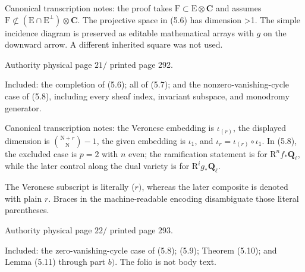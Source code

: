 \documentclass[10pt,leqno]{article}
\begin{document}
\noindent Canonical transcription notes: the proof takes \(\mathrm{F}\subset \mathrm{E}\otimes \mathbf{C}\) and assumes \(\mathrm{F}\not\subset (\mathrm{E}\cap \mathrm{E}^{\perp })\otimes \mathbf{C}\). The projective space in (5.6) has dimension >1. The simple incidence diagram is preserved as editable mathematical arrays with \(g\) on the downward arrow. \(\mathrm{A}\) different inherited square was not used.\par

\clearpage

\label{physical-21}\par\smallskip

\noindent Authority physical page \(21 /\) printed page 292.\par

\noindent Included: the completion of (5.6); all of (5.7); and the nonzero-vanishing-cycle case of (5.8), including every sheaf index, invariant subspace, and monodromy generator.\par

\noindent Canonical transcription notes: the Veronese embedding is \(\iota_{(r)}\), the displayed dimension is \(\binom{\mathrm{N}+r}{\mathrm{N}}- 1\), the given embedding is \(\iota _{1}\), and \(\iota _{r}=\iota_{(r)}\circ \iota _{1}\). In (5.8), the excluded case is \(p=2\) with \(n\) even; the ramification statement is for \(\mathrm{R}^{n} f_{*}\mathbf{Q}_{\ell }\), while the later control along the dual variety is for \(\mathrm{R}^{i} g_{*}\mathbf{Q}_{\ell }\).\par

\noindent The Veronese subscript is literally (\(r)\), whereas the later composite is denoted with plain \(r\). Braces in the machine-readable encoding disambiguate those literal parentheses.\par

\clearpage

\label{physical-22}\par\smallskip

\noindent Authority physical page \(22 /\) printed page 293.\par

\noindent Included: the zero-vanishing-cycle case of (5.8); (5.9); Theorem (5.10); and Lemma (5.11) through part \(b)\). The folio is not body text.\par
\end{document}
